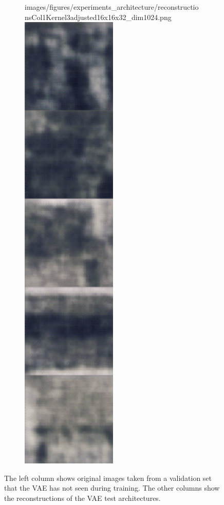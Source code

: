 \begin{figure}[H]
\begin{subfigure}[t]{.19\textwidth}
        {images/figures/experiments_architecture/reconstructionsCol1Kernel3adjusted16x16x32_dim1024.png}\hfill
        \includegraphics[width=0.5\textwidth]
        {images/figures/experiments_architecture/reconstructionsCol2Kernel3adjusted16x16x32_dim1024.png}
        \caption{}
    \end{subfigure}
    \caption{The left column shows original images taken from a validation set that the VAE has not seen during
    training. The other columns show the reconstructions of the VAE test architectures.}
\end{figure} \label{figure_reconstructions_1}

